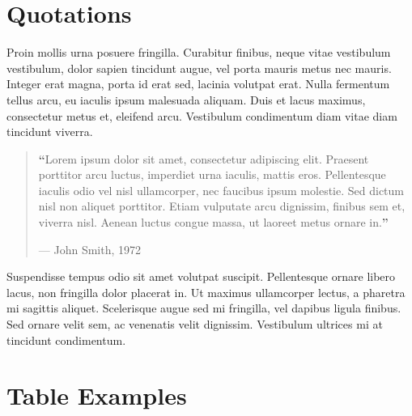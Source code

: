\documentclass[
	a4paper, %
	12pt, %
]{CSSullivanBusinessReport}
\begin{document}

\section{Quotations}

Proin mollis urna posuere fringilla. Curabitur finibus, neque vitae vestibulum vestibulum, dolor sapien tincidunt augue, vel porta mauris metus nec mauris. Integer erat magna, porta id erat sed, lacinia volutpat erat. Nulla fermentum tellus arcu, eu iaculis ipsum malesuada aliquam. Duis et lacus maximus, consectetur metus et, eleifend arcu. Vestibulum condimentum diam vitae diam tincidunt viverra. %

\begin{quote}
	\textbf{\LARGE ``}Lorem ipsum dolor sit amet, consectetur adipiscing elit. Praesent porttitor arcu luctus, imperdiet urna iaculis, mattis eros. Pellentesque iaculis odio vel nisl ullamcorper, nec faucibus ipsum molestie. Sed dictum nisl non aliquet porttitor. Etiam vulputate arcu dignissim, finibus sem et, viverra nisl. Aenean luctus congue massa, ut laoreet metus ornare in.\textbf{''}
	
	\hfill--- John Smith, 1972
\end{quote}

Suspendisse tempus odio sit amet volutpat suscipit. Pellentesque ornare libero lacus, non fringilla dolor placerat in. Ut maximus ullamcorper lectus, a pharetra mi sagittis aliquet. Scelerisque augue sed mi fringilla, vel dapibus ligula finibus. Sed ornare velit sem, ac venenatis velit dignissim. Vestibulum ultrices mi at tincidunt condimentum.


\section{Table Examples}
\end{document}
